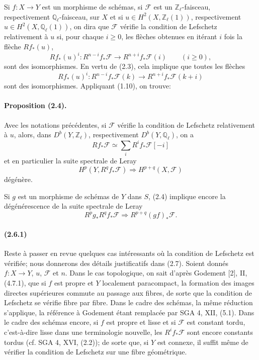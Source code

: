 \documentclass[10pt]{article}
\newcommand{\Fcal}{\mathcal F}
\newcommand{\Z}{\mathbb Z}
\newcommand{\Q}{\mathbb Q}
\begin{document}
Si $f:X\to Y$ est un morphisme de schémas, si $\Fcal$ est un $\Z_\ell$-faisceau, respectivement $\Q_\ell$-faisceau, sur $X$ et si $u\in H^2(X,\Z_\ell(1))$, respectivement $u\in H^2(X,\Q_\ell(1))$, on dira que $\Fcal$ vérifie la condition de Lefschetz relativement à $u$ si, pour chaque $i\ge0$, les flèches obtenues en itérant $i$ fois la flèche $Rf_*(u)$,
\[
Rf_*(u)^i:R^{n-i}f_*\Fcal\longrightarrow R^{n+i}f_*\Fcal(i)\qquad(i\ge0),
\]
sont des isomorphismes. En vertu de (2.3), cela implique que toutes les flèches
\[
Rf_*(u)^i:R^{n-i}f_*\Fcal(k)\longrightarrow R^{n+i}f_*\Fcal(k+i)
\]
sont des isomorphismes. Appliquant (1.10), on trouve:

\paragraph{Proposition (2.4).} Avec les notations précédentes, si $\Fcal$ vérifie la condition de Lefschetz relativement à $u$, alors, dans $D^b(Y,\Z_\ell)$, respectivement $D^b(Y,\Q_\ell)$, on a
\[
\tag{2.5}
Rf_*\Fcal\simeq\sum_iR^if_*\Fcal[-i]
\]
et en particulier la suite spectrale de Leray
\[
H^p(Y,R^qf_*\Fcal)\Longrightarrow H^{p+q}(X,\Fcal)
\]
dégénère.



Si $g$ est un morphisme de schémas de $Y$ dans $S$, (2.4) implique encore la dégénérescence de la suite spectrale de Leray
\[
R^p g_* R^q f_*\mathcal F\Longrightarrow R^{p+q}(gf)_*\mathcal F.
\]

\paragraph{(2.6.1)} Reste à passer en revue quelques cas intéressants où la condition de Lefschetz est vérifiée; nous donnerons des détails justificatifs dans (2.7). Soient donnés $f:X\to Y$, $u$, $\mathcal F$ et $n$. Dans le cas topologique, on sait d'après Godement [2], II, (4.7.1), que si $f$ est propre et $Y$ localement paracompact, la formation des images directes supérieures commute au passage aux fibres, de sorte que la condition de Lefschetz se vérifie fibre par fibre. Dans le cadre des schémas, la même réduction s'applique, la référence à Godement étant remplacée par SGA 4, XII, (5.1). Dans le cadre des schémas encore, si $f$ est propre et lisse et si $\mathcal F$ est constant tordu, c'est-à-dire lisse dans une terminologie nouvelle, les $R^if_*\mathcal F$ sont encore constants tordus (cf. SGA 4, XVI, (2.2)); de sorte que, si $Y$ est connexe, il suffit même de vérifier la condition de Lefschetz sur une fibre géométrique.
\end{document}
